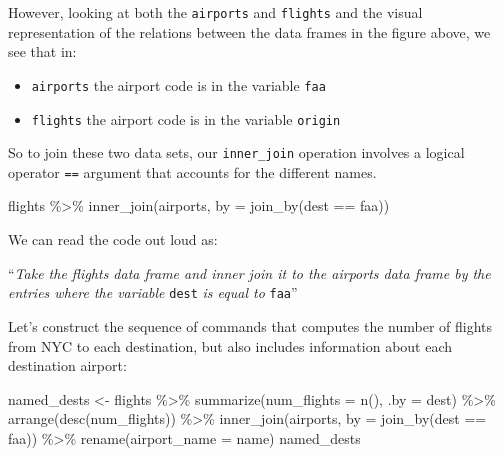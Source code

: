 \documentclass[
  letterpaper,
  DIV=11,
  numbers=noendperiod]{scrartcl}
\newenvironment{Shaded}{\begin{snugshade}}{\end{snugshade}}
\newcommand{\AttributeTok}[1]{\textcolor[rgb]{0.40,0.45,0.13}{#1}}
\newcommand{\FunctionTok}[1]{\textcolor[rgb]{0.28,0.35,0.67}{#1}}
\newcommand{\NormalTok}[1]{\textcolor[rgb]{0.00,0.23,0.31}{#1}}
\newcommand{\OtherTok}[1]{\textcolor[rgb]{0.00,0.23,0.31}{#1}}
\newcommand{\SpecialCharTok}[1]{\textcolor[rgb]{0.37,0.37,0.37}{#1}}
\providecommand{\tightlist}{%
  \setlength{\itemsep}{0pt}\setlength{\parskip}{0pt}}\usepackage{longtable,booktabs,array}
\begin{document}
However, looking at both the \texttt{airports} and \texttt{flights} and
the visual representation of the relations between the data frames in
the figure above, we see that in:

\begin{itemize}
\tightlist
\item
  \texttt{airports} the airport code is in the variable \texttt{faa}
\item
  \texttt{flights} the airport code is in the variable \texttt{origin}
\end{itemize}

So to join these two data sets, our \texttt{inner\_join} operation
involves a logical operator \texttt{==} argument that accounts for the
different names.

\begin{Shaded}
\begin{Highlighting}[]
\NormalTok{flights }\SpecialCharTok{\%\textgreater{}\%}
  \FunctionTok{inner\_join}\NormalTok{(airports,}
             \AttributeTok{by =} \FunctionTok{join\_by}\NormalTok{(dest }\SpecialCharTok{==}\NormalTok{ faa))}
\end{Highlighting}
\end{Shaded}

We can read the code out loud as:

``\emph{Take the flights data frame and inner join it to the airports
data frame by the entries where the variable} \texttt{dest} \emph{is
equal to} \texttt{faa}''

Let's construct the sequence of commands that computes the number of
flights from NYC to each destination, but also includes information
about each destination airport:

\begin{Shaded}
\begin{Highlighting}[]
\NormalTok{named\_dests }\OtherTok{\textless{}{-}}\NormalTok{ flights }\SpecialCharTok{\%\textgreater{}\%}
  \FunctionTok{summarize}\NormalTok{(}\AttributeTok{num\_flights =} \FunctionTok{n}\NormalTok{(),}
            \AttributeTok{.by =}\NormalTok{ dest)  }\SpecialCharTok{\%\textgreater{}\%}
  \FunctionTok{arrange}\NormalTok{(}\FunctionTok{desc}\NormalTok{(num\_flights))  }\SpecialCharTok{\%\textgreater{}\%}
  \FunctionTok{inner\_join}\NormalTok{(airports, }\AttributeTok{by =} \FunctionTok{join\_by}\NormalTok{(dest }\SpecialCharTok{==}\NormalTok{ faa)) }\SpecialCharTok{\%\textgreater{}\%}
  \FunctionTok{rename}\NormalTok{(}\AttributeTok{airport\_name =}\NormalTok{ name)}
\NormalTok{named\_dests}
\end{Highlighting}
\end{Shaded}
\end{document}

